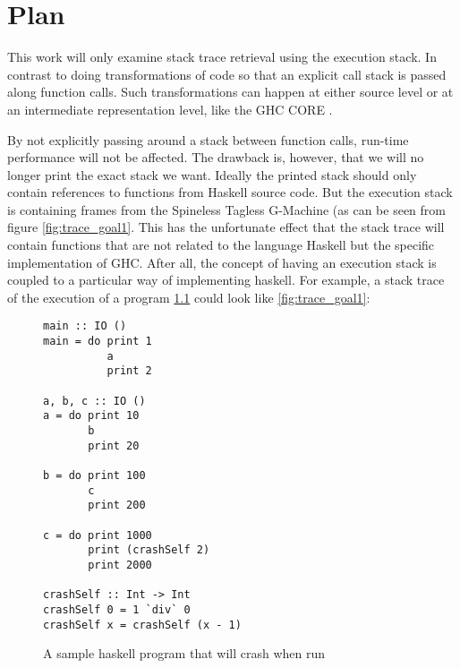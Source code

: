 \chapter{Plan}

This work will only examine stack trace retrieval using the execution stack. In
contrast to doing transformations of code so that an explicit call stack is
passed along function calls. Such transformations  can happen at either source
level \cite{source_transformation} or at an intermediate representation level, like the GHC
CORE \cite{FindingTheNeedle2009}.

By not explicitly passing around a stack between function calls, run-time
performance will not be affected. The drawback is, however,
that we will no longer print the exact stack we want. Ideally the printed
stack should only contain references to functions from Haskell source code. But
the execution stack is containing frames from the Spineless Tagless G-Machine
(as can be seen from figure \ref{fig:trace_goal1}.  This has the unfortunate effect that the stack
trace will contain functions that are not related to the language Haskell but
the specific implementation of GHC. After all, the concept of having an
execution stack is coupled to a particular way of implementing haskell.
For example, a stack trace of the execution of a program
\ref{fig:sample_program}
could look like \ref{fig:trace_goal1}:

\begin{figure}
  \begin{verbatim}
main :: IO ()
main = do print 1
          a
          print 2

a, b, c :: IO ()
a = do print 10
       b
       print 20

b = do print 100
       c
       print 200

c = do print 1000
       print (crashSelf 2)
       print 2000

crashSelf :: Int -> Int
crashSelf 0 = 1 `div` 0
crashSelf x = crashSelf (x - 1)
  \end{verbatim}
  \caption{A sample haskell program that will crash when run}
  \label{fig:sample_program}
\end{figure}




